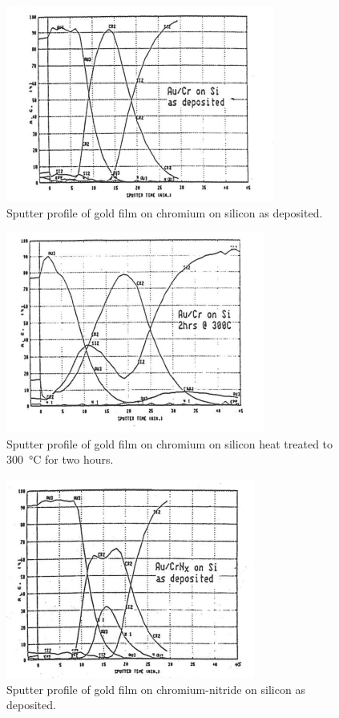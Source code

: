 \begin{figure}[h!]
	\begin{center}
	\includegraphics[scale=4.5]{figures/07_11a.png}
	\caption{Sputter profile of gold film on chromium on silicon as deposited.}
	\label{fig:aucrsisputter}
	\end{center}
\end{figure}

\begin{figure}[h!]
	\begin{center}
	\includegraphics[scale=4.5]{figures/07_11b.png}
	\caption{Sputter profile of gold film on chromium on silicon heat treated to \SI{300}{\degreeCelsius} for two hours.}
	\label{fig:aucrsiheatsputter}
	\end{center}
\end{figure}

\begin{figure}[h!]
	\begin{center}
	\includegraphics[scale=4.5]{figures/07_12a.png}
	\caption{Sputter profile of gold film on chromium-nitride on silicon as deposited.}
	\label{fig:aucrnsisputter}
	\end{center}
\end{figure}


